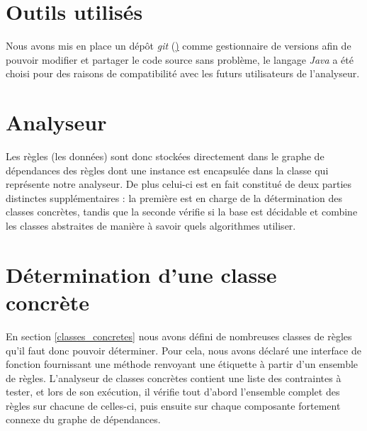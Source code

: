 
\section{Outils utilisés}\label{outils}
Nous avons mis en place un dépôt {\em git} (\href{}) 
comme gestionnaire de versions afin de pouvoir
modifier et partager le code source sans problème, le langage {\em Java} a été choisi
pour des raisons de compatibilité avec les futurs utilisateurs de l'analyseur.



\section{Analyseur}\label{impl_grd_analyser}
Les règles (les données) sont donc stockées directement dans le graphe de dépendances des
règles dont une instance est encapsulée dans la classe  qui représente
notre analyseur.
De plus celui-ci est en fait constitué de deux parties distinctes supplémentaires
: la première est en charge de la détermination des classes concrètes, tandis que la
seconde vérifie si la base est décidable et combine les classes
abstraites de manière à savoir quels algorithmes utiliser.

\section{Détermination d'une classe concrète}\label{impl_classe_concrete}
En section \ref{classes_concretes} nous avons défini de nombreuses classes de règles
qu'il faut donc pouvoir déterminer.
Pour cela, nous avons déclaré une interface de fonction 
fournissant une méthode renvoyant une étiquette à partir d'un ensemble de règles.
L'analyseur de classes concrètes contient une liste des contraintes à tester, et lors de
son exécution, il vérifie tout d'abord l'ensemble complet des règles sur chacune de
celles-ci, puis ensuite sur chaque composante fortement connexe du graphe de dépendances.


